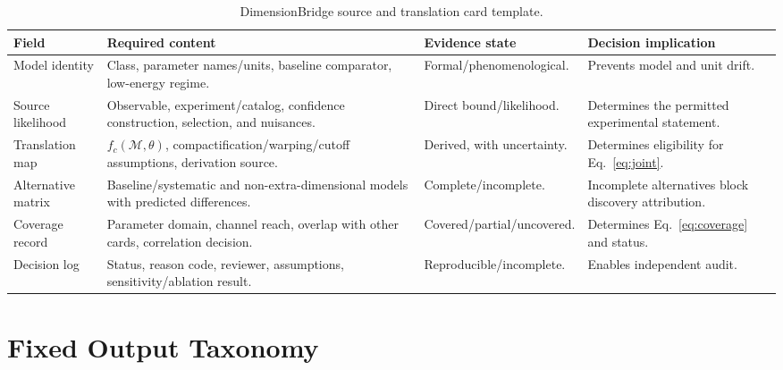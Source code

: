 \documentclass[conference]{IEEEtran}
\newcommand{\model}{\mathcal{M}}
\begin{document}
\begin{table}[t]
\caption{DimensionBridge source and translation card template.}
\label{tab:registry}
\centering
\footnotesize
\setlength{\tabcolsep}{2.5pt}
\begin{tabular}{p{} p{} p{} p{}}
\toprule
\textbf{Field} & \textbf{Required content} & \textbf{Evidence state} & \textbf{Decision implication} \\
\midrule
Model identity & Class, parameter names/units, baseline comparator, low-energy regime. & Formal/phenomenological. & Prevents model and unit drift. \\
Source likelihood & Observable, experiment/catalog, confidence construction, selection, and nuisances. & Direct bound/likelihood. & Determines the permitted experimental statement. \\
Translation map & $f_c(\model,\theta)$, compactification/warping/cutoff assumptions, derivation source. & Derived, with uncertainty. & Determines eligibility for Eq.~\eqref{eq:joint}. \\
Alternative matrix & Baseline/systematic and non-extra-dimensional models with predicted differences. & Complete/incomplete. & Incomplete alternatives block discovery attribution. \\
Coverage record & Parameter domain, channel reach, overlap with other cards, correlation decision. & Covered/partial/uncovered. & Determines Eq.~\eqref{eq:coverage} and status. \\
Decision log & Status, reason code, reviewer, assumptions, sensitivity/ablation result. & Reproducible/incomplete. & Enables independent audit. \\
\bottomrule
\end{tabular}
\end{table}

\section{Fixed Output Taxonomy}
\end{document}
